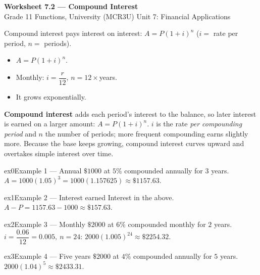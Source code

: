 \documentclass[11pt]{article}
\begin{document}
\begin{center}
{\LARGE\bfseries\color{titleblue}Worksheet 7.2 --- Compound Interest}\\[2pt]
{\small Grade 11 Functions, University (MCR3U) \textperiodcentered{} Unit 7: Financial Applications}
\end{center}

\begin{ideabox}
Compound interest pays interest on interest: $A=P(1+i)^{n}$ ($i=$ rate per period, $n=$ periods).
\begin{itemize}[leftmargin=*,itemsep=2pt]
  \item $A=P(1+i)^{n}$.
  \item Monthly: $i=\dfrac{r}{12}$, $n=12\times$years.
  \item It grows exponentially.
\end{itemize}
\end{ideabox}

\begin{learnbox}
\textbf{Compound interest} adds each period's interest to the balance, so later interest is earned on a larger amount: $A=P(1+i)^n$.
$i$ is the rate \emph{per compounding period} and $n$ the number of periods; more frequent compounding earns slightly more.
Because the base keeps growing, compound interest curves upward and overtakes simple interest over time.
\end{learnbox}


\begin{example}{ex0}{Example 1 --- Annual}
$\$1000$ at $5\%$ compounded annually for $3$ years.\soln $A=1000(1.05)^{3}=1000(1.157625)\approx\$1157.63$.
\end{example}

\begin{example}{ex1}{Example 2 --- Interest earned}
Interest in the above.\soln $A-P=1157.63-1000\approx\$157.63$.
\end{example}

\begin{example}{ex2}{Example 3 --- Monthly}
$\$2000$ at $6\%$ compounded monthly for $2$ years.\soln $i=\dfrac{0.06}{12}=0.005,\ n=24$: $2000(1.005)^{24}\approx\$2254.32$.
\end{example}

\begin{example}{ex3}{Example 4 --- Five years}
$\$2000$ at $4\%$ compounded annually for $5$ years.\soln $2000(1.04)^{5}\approx\$2433.31$.
\end{example}
\end{document}
